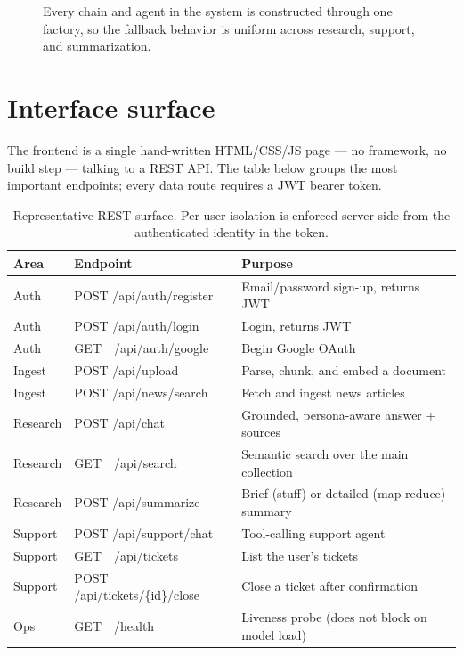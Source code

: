 \documentclass[11pt]{article}
\newcommand{\code}[1]{{\ttfamily\small #1}}
\begin{document}
\begin{figure}[H]
\centering

\caption{Every chain and agent in the system is constructed through one factory, so
the fallback behavior is uniform across research, support, and summarization.}
\end{figure}

\section{Interface surface}
\label{sec:api}

The frontend is a single hand-written HTML/CSS/JS page --- no framework, no build
step --- talking to a REST API. The table below groups the most important
endpoints; every data route requires a JWT bearer token.

\begin{table}[H]
\small
\setlength{\tabcolsep}{7pt}\renewcommand{\arraystretch}{1.25}
\begin{tabularx}{\linewidth}{@{}l l L@{}}
\toprule
\sffamily\bfseries Area & \sffamily\bfseries Endpoint & \sffamily\bfseries Purpose \\
\midrule
Auth     & \code{POST /api/auth/register} & Email/password sign-up, returns JWT \\
Auth     & \code{POST /api/auth/login}    & Login, returns JWT \\
Auth     & \code{GET\ \ /api/auth/google}  & Begin Google OAuth \\
Ingest   & \code{POST /api/upload}        & Parse, chunk, and embed a document \\
Ingest   & \code{POST /api/news/search}   & Fetch and ingest news articles \\
Research & \code{POST /api/chat}          & Grounded, persona-aware answer + sources \\
Research & \code{GET\ \ /api/search}       & Semantic search over the main collection \\
Research & \code{POST /api/summarize}     & Brief (stuff) or detailed (map-reduce) summary \\
Support  & \code{POST /api/support/chat}  & Tool-calling support agent \\
Support  & \code{GET\ \ /api/tickets}      & List the user's tickets \\
Support  & \code{POST /api/tickets/\{id\}/close} & Close a ticket after confirmation \\
Ops      & \code{GET\ \ /health}           & Liveness probe (does not block on model load) \\
\bottomrule
\end{tabularx}
\caption{Representative REST surface. Per-user isolation is enforced server-side
from the authenticated identity in the token.}
\end{table}
\end{document}
